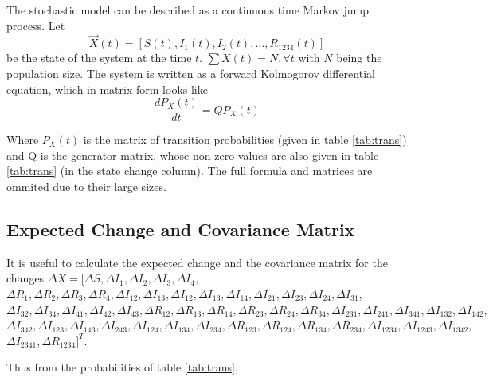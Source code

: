 \documentclass[12pt]{article}
\begin{document}
The stochastic model can be described as a continuous time Markov jump process. 
Let
$$\overrightarrow{X}(t) = [S(t), I_1(t), I_2(t), \ldots, R_{1234}(t)]$$ 
be the 
state of the system at the time $t$. $\sum X(t) = N, \forall t$ with $N$ being 
the population size. 
The system is written as a forward Kolmogorov differential equation, which in 
matrix form looks like
\begin{equation}
\frac{dP_X(t)}{dt} = Q P_X(t) 
\end{equation}

Where $P_X(t)$ is  the matrix of transition probabilities (given in table 
\ref{tab:trans}) and Q is the generator matrix, whose non-zero values are also 
given in table \ref{tab:trans} (in the state change column). The full formula 
and matrices are ommited due to their large sizes.

\subsection*{Expected Change and Covariance Matrix}

It is useful to calculate the expected change and the covariance matrix for the 
changes $\Delta X = [\Delta S, \Delta I_1, \Delta I_2, \Delta I_3, \Delta I_4,$
$\Delta R_1, \Delta R_2, \Delta R_3, \Delta R_4,\Delta I_{12}, \Delta I_{13},
\Delta I_{12}, \Delta I_{13}, 
\Delta I_{14}, \Delta I_{21}, \Delta I_{23}, \Delta I_{24}, \Delta I_{31},$
$\Delta I_{32}, 
\Delta I_{34}, \Delta I_{41}, \Delta I_{42}, \Delta I_{43}, \Delta R_{12}, 
\Delta R_{13}, \Delta R_{14}, \Delta R_{23}, \Delta R_{24}, \Delta R_{34},
\Delta I_{231}, \Delta I_{241}, \Delta I_{341}, \Delta I_{132}, \Delta I_{142},$
$\Delta I_{342}, \Delta I_{123}, \Delta I_{143}, \Delta I_{243}, \Delta I_{124},
\Delta I_{134}, \Delta I_{234}, \Delta R_{123}, \Delta R_{124}, \Delta R_{134},
\Delta R_{234}, \Delta I_{1234}, \Delta I_{1243}, \Delta I_{1342},$\\
$\Delta I_{2341},\Delta R_{1234}]^T$.


Thus from the probabilities of table \ref{tab:trans},
\end{document}
